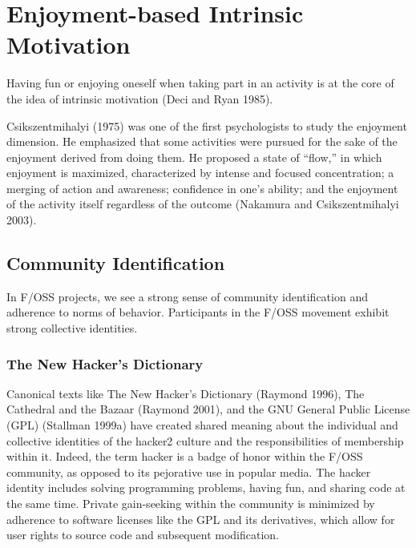 \documentclass{mitpress}
\begin{document}
\section{Enjoyment-based Intrinsic Motivation} 
Having fun or enjoying oneself
when taking part in an activity is at the core of the idea of intrinsic
motivation (Deci and Ryan 1985). 

Csikszentmihalyi (1975) was one of the first
psychologists to study the enjoyment dimension. He emphasized that
some activities were pursued for the sake of the enjoyment derived from
doing them. He proposed a state of ``flow,'' in which enjoyment is maximized,
characterized by intense and focused concentration; a merging of
action and awareness; confidence in one's ability; and the enjoyment of
the activity itself regardless of the outcome (Nakamura and Csikszentmihalyi
2003). 

\subsection{Community Identification}
In F/OSS projects, we see a strong sense of community identification and
adherence to norms of behavior. Participants in the F/OSS movement
exhibit strong collective identities. 

\subsubsection{The New Hacker's Dictionary}
Canonical texts like The New Hacker's
Dictionary (Raymond 1996), The Cathedral and the Bazaar (Raymond 2001),
and the GNU General Public License (GPL) (Stallman 1999a) have created
shared meaning about the individual and collective identities of the
hacker2 culture and the responsibilities of membership within it. Indeed,
the term hacker is a badge of honor within the F/OSS community, as
opposed to its pejorative use in popular media. The hacker identity
includes solving programming problems, having fun, and sharing code at
the same time. Private gain-seeking within the community is minimized
by adherence to software licenses like the GPL and its derivatives, which
allow for user rights to source code and subsequent modification.
\end{document}
